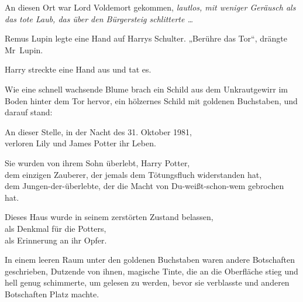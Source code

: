 An diesen Ort war Lord Voldemort gekommen, \emph{lautlos, mit weniger Geräusch als das tote Laub, das über den Bürgersteig schlitterte …}

Remus Lupin legte eine Hand auf Harrys Schulter.
„Berühre das Tor“, drängte Mr~Lupin.

Harry streckte eine Hand aus und tat es.

Wie eine schnell wachsende Blume brach ein Schild aus dem Unkrautgewirr im Boden hinter dem Tor hervor, ein hölzernes Schild mit goldenen Buchstaben, und darauf stand:

\begin{center}
An dieser Stelle, in der Nacht des 31. Oktober 1981,\\
verloren Lily und James Potter ihr Leben.

Sie wurden von ihrem Sohn überlebt, Harry Potter,\\
dem einzigen Zauberer, der jemals dem Tötungsfluch widerstanden hat,\\
dem Jungen-der-überlebte, der die Macht von Du-weißt-schon-wem gebrochen hat.

Dieses Haus wurde in seinem zerstörten Zustand belassen,\\
als Denkmal für die Potters,\\
als Erinnerung an ihr Opfer.
\end{center}

In einem leeren Raum unter den goldenen Buchstaben waren andere Botschaften geschrieben, Dutzende von ihnen, magische Tinte, die an die Oberfläche stieg und hell genug schimmerte, um gelesen zu werden, bevor sie verblasste und anderen Botschaften Platz machte.

